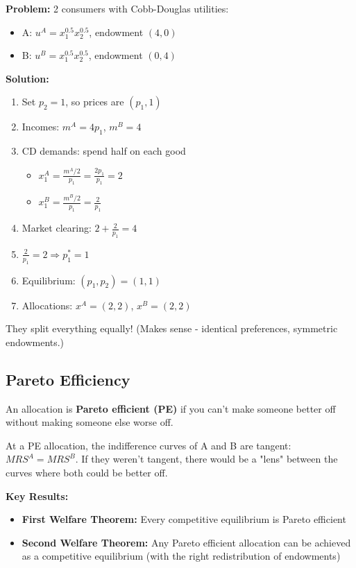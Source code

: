 \documentclass[11pt]{article}
\begin{document}
\begin{example}
\textbf{Problem:} 2 consumers with Cobb-Douglas utilities:
\begin{itemize}
    \item A: $u^A = x_1^{0.5} x_2^{0.5}$, endowment $(4, 0)$
    \item B: $u^B = x_1^{0.5} x_2^{0.5}$, endowment $(0, 4)$
\end{itemize}

\textbf{Solution:}
\begin{enumerate}
    \item Set $p_2 = 1$, so prices are $(p_1, 1)$
    \item Incomes: $m^A = 4p_1$, $m^B = 4$
    \item CD demands: spend half on each good
    \begin{itemize}
        \item $x_1^A = \frac{m^A/2}{p_1} = \frac{2p_1}{p_1} = 2$
        \item $x_1^B = \frac{m^B/2}{p_1} = \frac{2}{p_1}$
    \end{itemize}
    \item Market clearing: $2 + \frac{2}{p_1} = 4$
    \item $\frac{2}{p_1} = 2 \Rightarrow p_1^* = 1$
    \item Equilibrium: $(p_1, p_2) = (1, 1)$
    \item Allocations: $x^A = (2, 2)$, $x^B = (2, 2)$
\end{enumerate}

They split everything equally! (Makes sense - identical preferences, symmetric endowments.)
\end{example}

\subsection{Pareto Efficiency}

An allocation is \textbf{Pareto efficient (PE)} if you can't make someone better off without making someone else worse off.

\begin{intuition}
At a PE allocation, the indifference curves of A and B are tangent: $MRS^A = MRS^B$. If they weren't tangent, there would be a "lens" between the curves where both could be better off.
\end{intuition}

\textbf{Key Results:}
\begin{itemize}
    \item \textbf{First Welfare Theorem:} Every competitive equilibrium is Pareto efficient
    \item \textbf{Second Welfare Theorem:} Any Pareto efficient allocation can be achieved as a competitive equilibrium (with the right redistribution of endowments)
\end{itemize}
\end{document}
